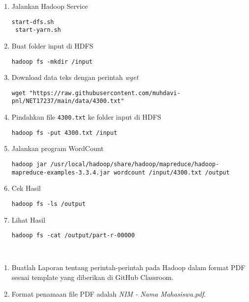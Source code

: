 \documentclass[a4paper]{tufte-handout}
\begin{document}
\begin{enumerate}
\item Jalankan Hadoop Service
\begin{lstlisting}[language=Terminal]
 start-dfs.sh
 start-yarn.sh
\end{lstlisting}

\item Buat folder input di HDFS
\begin{lstlisting}[language=Terminal]
 hadoop fs -mkdir /input
\end{lstlisting}

\item Download data teks dengan perintah \textit{wget}
\begin{lstlisting}[language=Terminal]
 wget "https://raw.githubusercontent.com/muhdavi-pnl/NET17237/main/data/4300.txt"
\end{lstlisting}

\item Pindahkan file {\tt 4300.txt} ke folder input di HDFS
\begin{lstlisting}[language=Terminal]
 hadoop fs -put 4300.txt /input
\end{lstlisting}

\item Jalankan program WordCount
\begin{lstlisting}[language=Terminal]
 hadoop jar /usr/local/hadoop/share/hadoop/mapreduce/hadoop-mapreduce-examples-3.3.4.jar wordcount /input/4300.txt /output
\end{lstlisting} 

\item Cek Hasil
\begin{lstlisting}[language=Terminal]
 hadoop fs -ls /output
\end{lstlisting} 

\item Lihat Hasil
\begin{lstlisting}[language=Terminal]
 hadoop fs -cat /output/part-r-00000
\end{lstlisting} 
\end{enumerate}

 \\
\begin{enumerate}
\item Buatlah Laporan tentang perintah-perintah pada Hadoop dalam format PDF sesuai template yang diberikan di GitHub Classroom. 
\item Format penamaan file PDF adalah \textit{NIM - Nama Mahasiswa.pdf}.
\end{enumerate}
\end{document}
